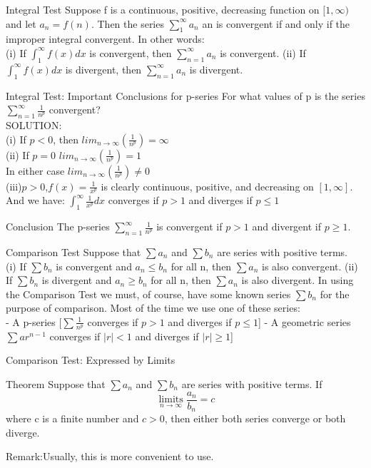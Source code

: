 \documentclass{beamer}
\begin{document}
\begin{frame}{Integral Test}
    Suppose f is a continuous, positive, decreasing function on $[1,\infty)$ and let $a_n = f (n)$. Then the series $\sum_1^{\infty} a_n$ an is convergent if and only if the improper integral \is convergent. In other words:\\
    (i) If $\int_1^{\infty}f(x) dx$ is convergent, then $\sum_{n=1}^{\infty}a_n$ is convergent.
    (ii) If $\int_1^{\infty}f(x) dx$ is divergent, then $\sum_{n=1}^{\infty}a_n$ is divergent.

\end{frame}

\begin{frame}{Integral Test: Important Conclusions for p-series}
For what values of p is the series $\sum\limits_{n=1}^{\infty} \frac{1}{n^p}$ convergent?\\
SOLUTION:\\
(i) If $p<0$, then $lim_{n\rightarrow \infty}(\frac{1}{n^p})=\infty$\\
(ii) If $p=0$ $lim_{n\rightarrow \infty}(\frac{1}{n^p})=1$\\
In either case $lim_{n\rightarrow \infty}(\frac{1}{n^p}) \neq 0$\\
(iii)$p>0$,$f(x)=\frac{1}{x^p}$ is clearly continuous, positive, and decreasing on $[1,\infty]$. And we have:
$\int_1^{\infty} \frac{1}{x^p} dx $ converges if $p>1$ and diverges if $p \leqslant 1$
\begin{block}{Conclusion}
The p-series $\sum_{n=1}^{\infty}\frac{1}{n^p}$
is convergent if $p>1$ and divergent if $p \geqslant 1$.
\end{block}
\end{frame}

\begin{frame}{Comparison Test}
    Suppose that $\sum a_n$ and $\sum b_n$ are series with positive terms.\\
(i) If $\sum b_n$ is convergent and $a_n \leqslant b_n$ for all n, then $\sum a_n$ is also convergent.
(ii) If $\sum b_n$ is divergent and $a_n \geqslant b_n$ for all n, then $\sum a_n$ is also divergent.
In using the Comparison Test we must, of course, have some known series $\sum b_n$ for the purpose of comparison. Most of the time we use one of these
series:\\
- A p-series [$\sum \frac{1}{n^p}$ converges if $p > 1$ and diverges if $p \leqslant 1$]
- A geometric series $\sum ar^{n-1}$ converges if $|r| < 1$ and diverges if $|r| \geqslant 1$]
\end{frame}
\begin{frame}{Comparison Test: Expressed by Limits}
    \begin{block}{Theorem}
        Suppose that $\sum a_n$ and $\sum b_n$ are series with positive terms. If
$$\mathop{limits}\limits_{n \rightarrow \infty} \frac{a_n}{b_n}= c$$
where c is a finite number and $c > 0$, then either both series converge or both diverge.
    \end{block}
Remark:Usually, this is more convenient to use.
\end{frame}
\end{document}
